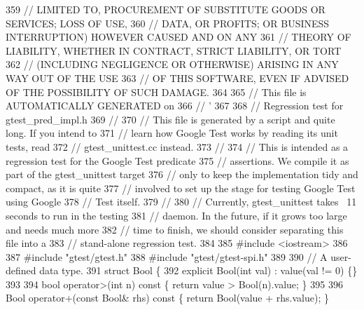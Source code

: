 \begin{DoxyCode}
{{{359 \textcolor{stringliteral}{// LIMITED TO, PROCUREMENT OF SUBSTITUTE GOODS OR SERVICES; LOSS OF USE,}
360 \textcolor{stringliteral}{// DATA, OR PROFITS; OR BUSINESS INTERRUPTION) HOWEVER CAUSED AND ON ANY}
361 \textcolor{stringliteral}{// THEORY OF LIABILITY, WHETHER IN CONTRACT, STRICT LIABILITY, OR TORT}
362 \textcolor{stringliteral}{// (INCLUDING NEGLIGENCE OR OTHERWISE) ARISING IN ANY WAY OUT OF THE USE}
363 \textcolor{stringliteral}{// OF THIS SOFTWARE, EVEN IF ADVISED OF THE POSSIBILITY OF SUCH DAMAGE.}
364 \textcolor{stringliteral}{}
365 \textcolor{stringliteral}{// This file is AUTOMATICALLY GENERATED on %
366 \textcolor{stringliteral}{// '%
367 \textcolor{stringliteral}{}
368 \textcolor{stringliteral}{// Regression test for gtest\_pred\_impl.h}
369 \textcolor{stringliteral}{//}
370 \textcolor{stringliteral}{// This file is generated by a script and quite long.  If you intend to}
371 \textcolor{stringliteral}{// learn how Google Test works by reading its unit tests, read}
372 \textcolor{stringliteral}{// gtest\_unittest.cc instead.}
373 \textcolor{stringliteral}{//}
374 \textcolor{stringliteral}{// This is intended as a regression test for the Google Test predicate}
375 \textcolor{stringliteral}{// assertions.  We compile it as part of the gtest\_unittest target}
376 \textcolor{stringliteral}{// only to keep the implementation tidy and compact, as it is quite}
377 \textcolor{stringliteral}{// involved to set up the stage for testing Google Test using Google}
378 \textcolor{stringliteral}{// Test itself.}
379 \textcolor{stringliteral}{//}
380 \textcolor{stringliteral}{// Currently, gtest\_unittest takes ~11 seconds to run in the testing}
381 \textcolor{stringliteral}{// daemon.  In the future, if it grows too large and needs much more}
382 \textcolor{stringliteral}{// time to finish, we should consider separating this file into a}
383 \textcolor{stringliteral}{// stand-alone regression test.}
384 \textcolor{stringliteral}{}
385 \textcolor{stringliteral}{#include <iostream>}
386 \textcolor{stringliteral}{}
387 \textcolor{stringliteral}{#include "gtest/gtest.h"}
388 \textcolor{stringliteral}{#include "gtest/gtest-spi.h"}
389 \textcolor{stringliteral}{}
390 \textcolor{stringliteral}{// A user-defined data type.}
391 \textcolor{stringliteral}{struct Bool \{}
392 \textcolor{stringliteral}{  explicit Bool(int val) : value(val != 0) \{\}}
393 \textcolor{stringliteral}{}
394 \textcolor{stringliteral}{  bool operator>(int n) const \{ return value > Bool(n).value; \}}
395 \textcolor{stringliteral}{}
396 \textcolor{stringliteral}{  Bool operator+(const Bool& rhs) const \{ return Bool(value + rhs.value); \}}
}}}}}
\end{DoxyCode}
